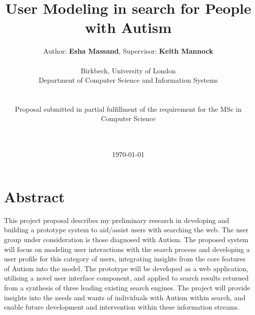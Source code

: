 \documentclass[a4paper, 11pt]{article}
\begin{document}
\LARGE\title{User Modeling in search for People with Autism}

\LARGE\author{Author: \textbf{Esha Massand}, Supervisor: \textbf{Keith Mannock}\\
\\
Birkbeck, University of London\\Department of Computer Science and Information Systems\\\\\\Proposal submitted in partial fulfillment of the requirement for the MSc in Computer Science\date{\mydate\today}
\\\
}

\normalsize


\maketitle


\section*{Abstract}
\begin{justify}
This project proposal describes my preliminary research in developing and building a prototype system to aid/assist users with searching the web. The user group under consideration is those diagnosed with Autism. The proposed system will focus on modeling user interactions with the search process and developing a user profile for this category of users, integrating insights from the core features of Autism into the model. The prototype will be developed as a web application, utilising a novel user interface component, and applied to search results returned from a synthesis of three leading existing search engines. The project will provide insights into the needs and wants of individuals with Autism within search, and enable future development and intervention within these information streams.\\
\end{justify}
\end{document}
